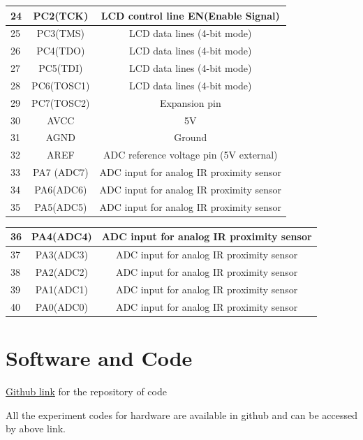 \documentclass[a4paper,12pt,oneside]{book}
\begin{document}
\begin{itemize}
\begin{tabular*}{\textwidth}{|l|c|c|}
	24 & PC2(TCK) & LCD control line EN(Enable Signal) \\
	\hline
	25 & PC3(TMS) & LCD data lines (4-bit mode) \\
	\hline
	26 & PC4(TDO) & LCD data lines (4-bit mode) \\
	\hline
	27 & PC5(TDI) & LCD data lines (4-bit mode) \\
	\hline
	28 & PC6(TOSC1) & LCD data lines (4-bit mode) \\
	\hline
	29 & PC7(TOSC2) & Expansion pin \\
	\hline
	30 & AVCC & 5V \\
	\hline
	31 & AGND & Ground \\
	\hline
	32 & AREF & ADC reference voltage pin (5V external) \\
	\hline
	33 & PA7 (ADC7) & ADC input for analog IR proximity sensor\\
	\hline
	34 & PA6(ADC6) & ADC input for analog IR proximity sensor\\
	\hline
	35 & PA5(ADC5) & ADC input for analog IR proximity sensor\\
	\hline
\end{tabular*}	

\begin{tabular*}{\textwidth}{|l|c|c|}
	36 & PA4(ADC4) & ADC input for analog IR proximity sensor\\
	\hline
	37 & PA3(ADC3) & ADC input for analog IR proximity sensor\\
	\hline
	38 & PA2(ADC2) & ADC input for analog IR proximity sensor\\
	\hline
	39 & PA1(ADC1) & ADC input for analog IR proximity sensor\\
	\hline
	40 & PA0(ADC0) & ADC input for analog IR proximity sensor\\
	\hline
	
\end{tabular*}

	\end{itemize}

\section{Software and Code}
\href{https://github.com/eYSIP-2017/eYSIP-2017_DistributedRobotics.git}{Github link} for the repository of code

All the experiment codes for hardware are available in github and can be accessed by above link.
\end{document}
